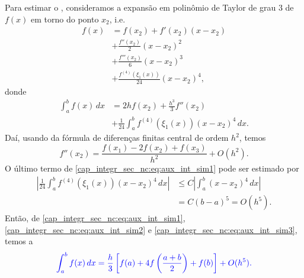 Para estimar o , consideramos a expansão em polinômio de Taylor{\taylor} de grau 3 de $f(x)$ em torno do ponto $x_2$, i.e.
\begin{equation}
  \begin{aligned}
    f(x) &= f(x_2) + f'(x_2)(x-x_2)\\
         &+ \frac{f''(x_2)}{2}(x-x_2)^2\\
         &+ \frac{f'''(x_2)}{6}(x-x_2)^3\\
         &+ \frac{f^{(4)}(\xi_1(x))}{24}(x-x_2)^4,
\end{aligned}
\end{equation}
donde
\begin{equation}\label{cap_integr_sec_nc:eq:aux_int_sim1}
  \begin{aligned}
    \int_a^b f(x)\,dx &= 2hf(x_2) + \frac{h^3}{3}f''(x_2)\\
    &+ \frac{1}{24}\int_a^bf^{(4)}(\xi_1(x))(x-x_2)^4\,dx.
  \end{aligned}
\end{equation}
Daí, usando da fórmula de diferenças finitas central de ordem $h^2$, temos
\begin{equation}\label{cap_integr_sec_nc:eq:aux_int_sim2}
  f''(x_2) = \frac{f(x_1) - 2f(x_2) + f(x_3)}{h^2} + O(h^2).
\end{equation}
O último termo de \eqref{cap_integr_sec_nc:eq:aux_int_sim1} pode ser estimado por
\begin{subequations}\label{cap_integr_sec_nc:eq:aux_int_sim3}
  \begin{align}
    \left|\frac{1}{24}\int_a^bf^{(4)}(\xi_1(x))(x-x_2)^4\,dx\right| &\leq C\left|\int_a^b (x-x_2)^4\,dx\right|\\
                                                                    &= C(b-a)^5 = O(h^5).
  \end{align}
\end{subequations}
Então, de \eqref{cap_integr_sec_nc:eq:aux_int_sim1}, \eqref{cap_integr_sec_nc:eq:aux_int_sim2} e \eqref{cap_integr_sec_nc:eq:aux_int_sim3}, temos a 
\begin{equation}\color{blue}\int_a^b f(x)\,dx = \frac{h}{3}\left[f(a) + 4f\left(\frac{a+b}{2}\right) + f(b)\right] + O(h^5).
\end{equation}

